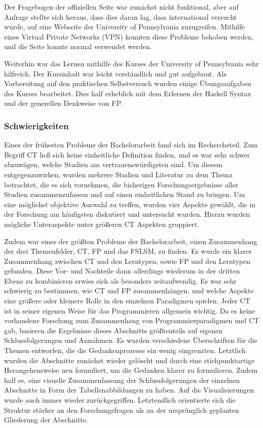 Der Fragebogen der offiziellen Seite war zunächst nicht funktional, aber auf Anfrage stellte sich heraus, dass dies daran lag, dass international versucht wurde, auf eine Webseite der University of Pennsylvania zuzugreifen. Mithilfe eines Virtual Private Networks (VPN) konnten diese Probleme behoben werden, und die Seite konnte normal verwendet werden.

Weiterhin war das Lernen mithilfe des Kurses der University of Pennsylvania sehr hilfreich. Der Kursinhalt war leicht verständlich und gut aufgebaut. Als Vorbereitung auf den praktischen Selbstversuch wurden einige Übungsaufgaben des Kurses bearbeitet. Dies half erheblich mit dem Erlernen der Haskell Syntax und der generellen Denkweise von FP.

\subsubsection{Schwierigkeiten}
Eines der frühesten Probleme der Bachelorarbeit fand sich im Rechercheteil. Zum Begriff CT ließ sich keine einheitliche Definition finden, und es war sehr schwer abzuwägen, welche Studien am vertrauenswürdigsten sind.
Um diesem entgegenzuwirken, wurden mehrere Studien und Literatur zu dem Thema betrachtet, die es sich vornehmen, die bisherigen Forschungsergebnisse aller Studien zusammenzufassen und auf einen einheitlichen Stand zu bringen. Um eine möglichst objektive Auswahl zu treffen, wurden vier Aspekte gewählt, die in der Forschung am häufigsten diskutiert und untersucht wurden. Hierzu wurden mögliche Unteraspekte unter größeren CT Aspekten gruppiert.

Zudem war eines der größten Probleme der Bachelorarbeit, einen Zusammenhang der drei Themenfelder, CT, FP und das FSLSM, zu finden. Es wurde ein klarer Zusammenhang zwischen CT und den Lerntypen, sowie FP und den Lerntypen gefunden. Diese Vor- und Nachteile dann allerdings wiederum in der dritten Ebene zu kombinieren erwies sich als besonders zeitaufwendig.
Es war sehr schwierig zu bestimmen, wie CT und FP zusammenhängen, und welche Aspekte eine größere oder kleinere Rolle in den einzelnen Paradigmen spielen. Jeder CT ist in seiner eigenen Weise für das Programmieren allgemein wichtig.
Da es keine vorhandene Forschung zum Zusammenhang von Programmierparadigmen und CT gab, basieren die Ergebnisse dieses Abschnitts größtenteils auf eigenen Schlussfolgerungen und Annahmen.
Es wurden verschiedene Überschriften für die Themen entworfen, die die Gedankenprozesse ein wenig eingrenzten. Letztlich wurden die Abschnitte zunächst wieder gelöscht und durch eine stichpunktartige Herangehensweise neu formuliert, um die Gedanken klarer zu formulieren. Zudem half es, eine visuelle Zusammenfassung der Schlussfolgerungen der einzelnen Abschnitte in Form der Tabellenabbildungen zu haben. Auf die Visualisierungen wurde auch immer wieder zurückgegriffen.
Letztendlich orientierte sich die Struktur stärker an den Forschungsfragen als an der ursprünglich geplanten Gliederung der Abschnitte.

